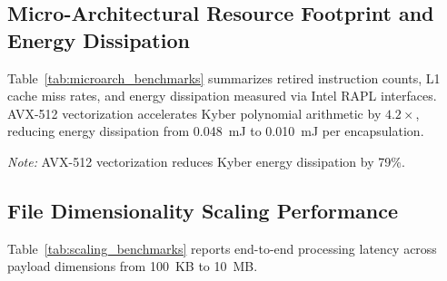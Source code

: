 \documentclass[sn-mathphys,Numbered]{sn-jnl}%
\theoremstyle{thmstyleone}%
\theoremstyle{thmstyletwo}%
\theoremstyle{thmstylethree}%
\begin{document}
\subsection{\textbf{Micro-Architectural Resource Footprint and Energy Dissipation}}
Table~\ref{tab:microarch_benchmarks} summarizes retired instruction counts, L1 cache miss rates, and energy dissipation measured via Intel RAPL interfaces. AVX-512 vectorization accelerates Kyber polynomial arithmetic by $4.2\times$, reducing energy dissipation from 0.048~mJ to 0.010~mJ per encapsulation.

\begin{table}[!htbp]
\centering
\caption{Energy consumption, memory RSS footprint, and instruction count microbenchmarks.}
\label{tab:microarch_benchmarks}
\vspace{0.3em}
\raggedright\small\textit{Note:} AVX-512 vectorization reduces Kyber energy dissipation by 79\%.
\end{table}

\subsection{\textbf{File Dimensionality Scaling Performance}}
Table~\ref{tab:scaling_benchmarks} reports end-to-end processing latency across payload dimensions from 100~KB to 10~MB.
\end{document}
